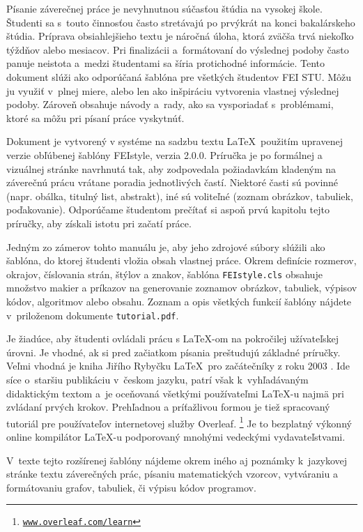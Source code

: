 Písanie záverečnej práce je nevyhnutnou súčasťou štúdia na vysokej škole.
Študenti sa s~touto činnosťou často stretávajú po prvýkrát na konci bakalárskeho štúdia.
Príprava obsiahlejšieho textu je náročná úloha,
ktorá zväčša trvá niekoľko týždňov alebo mesiacov.
Pri finalizácii a~formátovaní do výslednej podoby často panuje neistota a~medzi študentami sa šíria protichodné informácie.
Tento dokument slúži ako odporúčaná šablóna pre všetkých študentov FEI STU.
Môžu ju využiť v~plnej miere, alebo len ako inšpiráciu vytvorenia vlastnej výslednej podoby.
Zároveň obsahuje návody a~rady,
ako sa vysporiadať s~problémami,
ktoré sa môžu pri písaní práce vyskytnúť.

Dokument je vytvorený v systéme na sadzbu textu \LaTeX\ použitím upravenej verzie obľúbenej šablóny
FEIstyle, verzia 2.0.0. Príručka je po formálnej a vizuálnej stránke navrhnutá tak,
aby zodpovedala požiadavkám kladeným na záverečnú prácu vrátane poradia jednotlivých častí.
Niektoré časti sú povinné (napr. obálka, titulný list, abstrakt),
iné sú voliteľné (zoznam obrázkov, tabuliek, poďakovanie).
Odporúčame študentom prečítať si aspoň prvú kapitolu tejto príručky, aby získali istotu pri začatí práce.

Jedným zo zámerov tohto manuálu je,
aby jeho zdrojové súbory slúžili ako šablóna,
do ktorej študenti vložia obsah vlastnej práce.
Okrem definície rozmerov, okrajov, číslovania strán, štýlov a znakov, šablóna \verb|FEIstyle.cls| obsahuje množstvo makier a príkazov na generovanie zoznamov obrázkov, tabuliek, výpisov kódov, algoritmov alebo obsahu.
Zoznam a opis všetkých funkcií šablóny nájdete v~priloženom dokumente \verb|tutorial.pdf|.

Je žiadúce, aby študenti ovládali prácu s \LaTeX-om na pokročilej užívateľskej úrovni.
Je vhodné, ak si pred začiatkom písania preštudujú základné príručky. Veľmi vhodná je kniha
Jiřího Rybyčku \LaTeX\ pro začátečníky z roku 2003 \cite{Rybicka2003Latex}.
Ide síce o~staršiu publikáciu v~českom jazyku,
patrí však k~vyhľadávaným didaktickým textom
a~je oceňovaná všetkými používateľmi \LaTeX-u najmä pri zvládaní prvých krokov.
Prehľadnou a príťažlivou formou je tiež spracovaný tutoriál pre používateľov internetovej služby Overleaf.%
\footnote{\href{https://www.overleaf.com/learn}{\texttt{www.overleaf.com/learn}}}
Je to bezplatný výkonný online kompilátor \LaTeX-u podporovaný mnohými vedeckými vydavateľstvami.

V~texte tejto rozšírenej šablóny nájdeme okrem iného aj poznámky k~jazykovej stránke textu záverečných prác, písaniu matematických vzorcov, vytváraniu a formátovaniu grafov, tabuliek, či výpisu kódov programov.

